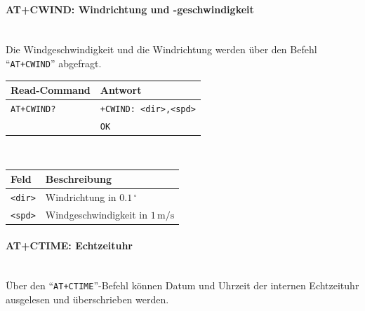         \paragraph{AT+CWIND: Windrichtung und -geschwindigkeit}\mbox{}\\
        Die Windgeschwindigkeit und die Windrichtung werden über den Befehl ``\texttt{AT+CWIND}'' abgefragt.
        
        \begin{table}[H]
            \centering
            \begin{tabular}{|p{}|p{}|}
                \hline
                \textbf{Read-Command} &\textbf{Antwort} \\
                \hline
                \texttt{AT+CWIND?}  & \texttt{+CWIND: <dir>,<spd>}\\
                & \texttt{OK}\\
                \hline
            \end{tabular}\\[3mm]
            \begin{tabular}{|p{}|p{}|}
                \hline
                \textbf{Feld}       & \textbf{Beschreibung}\\
                \hline
                \texttt{<dir>}      & Windrichtung in $0.1\,^\circ$\\
                \texttt{<spd>}      & Windgeschwindigkeit in $1\,\mathrm{m/s}$\\
                \hline
            \end{tabular}
        \end{table}
    
        \paragraph{AT+CTIME: Echtzeituhr}\mbox{}\\
        Über den ``\texttt{AT+CTIME}''-Befehl können Datum und Uhrzeit der internen Echtzeituhr ausgelesen und überschrieben werden.
        
